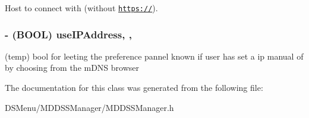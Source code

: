Host to connect with (without \href{https://}{\tt https\-://}). \hypertarget{interface_m_d_d_s_s_manager_a4851a2746d573ed0bceddef07fd520f7}{
\subsubsection[{use\-I\-P\-Address}]{\setlength{\rightskip}{0pt plus 5cm}-\/ (B\-O\-O\-L) use\-I\-P\-Address\hspace{0.3cm}{\ttfamily [read]}, {\ttfamily [write]}, {\ttfamily [atomic]}}}\label{interface_m_d_d_s_s_manager_a4851a2746d573ed0bceddef07fd520f7}
(temp) bool for leeting the preference pannel known if user has set a ip manual of by choosing from the m\-D\-N\-S browser 

The documentation for this class was generated from the following file\-:\begin{DoxyCompactItemize}
\item 
D\-S\-Menu/\-M\-D\-D\-S\-S\-Manager/M\-D\-D\-S\-S\-Manager.\-h\end{DoxyCompactItemize}
